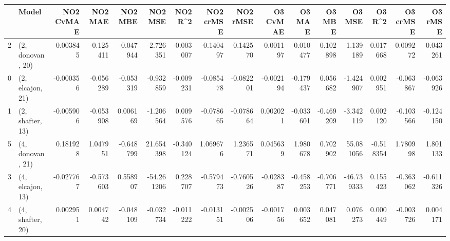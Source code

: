 \begin{tabular}{llrrrrrrrrrrrrrr}
\toprule
{} &             Model &  NO2 CvMAE &   NO2 MAE &   NO2 MBE &    NO2 MSE &   NO2 R\textasciicircum2 &  NO2 crMSE &  NO2 rMSE &  O3 CvMAE &    O3 MAE &    O3 MBE &     O3 MSE &    O3 R\textasciicircum2 &  O3 crMSE &   O3 rMSE \\
\midrule
2 &  (2, donovan, 20) &  -0.003845 & -0.125411 & -0.047944 &  -2.726351 & -0.003007 &  -0.140497 & -0.142570 & -0.001197 &  0.010477 &  0.102898 &   1.139189 &  0.017668 &  0.009272 &  0.043261 \\
0 &  (2, elcajon, 21) &  -0.000356 & -0.056289 & -0.053319 &  -0.932859 & -0.009231 &  -0.085478 & -0.082201 & -0.002194 & -0.179437 &  0.056682 &  -1.424907 &  0.002951 & -0.063867 & -0.063926 \\
1 &  (2, shafter, 13) &  -0.005906 & -0.053908 &  0.006169 &  -1.206564 &  0.009576 &  -0.078665 & -0.078664 &  0.002021 & -0.033601 & -0.469209 &  -3.342119 &  0.002120 & -0.103566 & -0.124150 \\
5 &  (4, donovan, 21) &   0.181928 &  1.047951 & -0.648799 &  21.654398 & -0.340124 &   1.069676 &  1.236571 &  0.045639 &  1.980678 &  0.702902 &  55.081056 & -0.518354 &  1.780998 &  1.801133 \\
3 &  (4, elcajon, 13) &  -0.027767 & -0.573603 &  0.558907 & -54.261206 &  0.228707 &  -0.579473 & -0.760526 & -0.028387 & -0.458253 & -0.706771 & -46.739333 &  0.155423 & -0.363062 & -0.611326 \\
4 &  (4, shafter, 20) &   0.002951 &  0.004742 & -0.048109 &  -0.032734 & -0.011222 &  -0.013151 & -0.002506 & -0.001756 &  0.003652 &  0.047081 &   0.076273 &  0.000449 & -0.003726 &  0.004171 \\
\bottomrule
\end{tabular}
